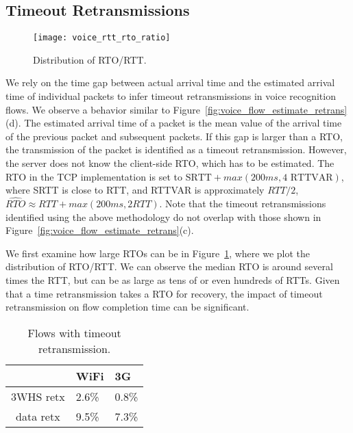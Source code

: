 \subsection{Timeout Retransmissions}\label{sec:v_rto}

\begin{figure}[th]
\centering
	\texttt{[image: voice\_rtt\_rto\_ratio]}
\caption{Distribution of RTO/RTT.}
\label{fig:rto_rtt}
\end{figure}

We rely on the time gap between actual arrival time and the estimated arrival time of individual packets to infer timeout retransmissions in voice recognition flows. We observe a behavior similar to Figure~\ref{fig:voice_flow_estimate_retrans}(d). The estimated arrival time of a packet is the mean value of the arrival time of the previous packet and subsequent packets. If this gap is larger than a RTO, the transmission of the packet is identified as a timeout retransmission. However, the server does not know the client-side RTO, which has to be estimated. The RTO in the TCP implementation is set to $\text{SRTT} + max(200ms, 4 \text{ RTTVAR})$\cite{rfc62982011computing}, where SRTT is close to RTT, and RTTVAR is approximately $RTT/2$, \ie $\widehat{RTO} \approx RTT + max(200ms, 2 RTT)$. Note that the timeout retransmissions identified using the above methodology do not overlap with those shown in Figure~\ref{fig:voice_flow_estimate_retrans}(c).

We first examine how large RTOs can be in Figure~\ref{fig:rto_rtt}, where we plot the distribution of RTO/RTT. We can observe the median RTO is around several times the RTT, but can be as large as tens of or even hundreds of RTTs. Given that a time retransmission takes a RTO for recovery, the impact of timeout retransmission on flow completion time can be significant.

\begin{table}[th]
\centering
\renewcommand{\arraystretch}{1.1}
\caption{Flows with timeout retransmission.}
\label{tab:voice_timeout_stats}
\begin{tabular}{c | C{2cm} | C{2cm}}
	\hline
	 & WiFi & 3G \\
	\hline
	3WHS retx & 2.6\% & 0.8\% \\
	data retx & 9.5\%  & 7.3\% \\
	\hline
\end{tabular}
\end{table}

